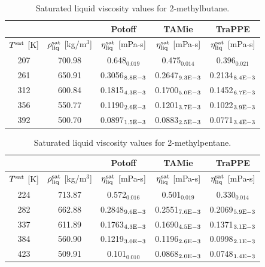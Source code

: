 \documentclass[preprint,review,11pt]{elsarticle}
\begin{document}
	\begin{table}[H]
		\caption{Saturated liquid viscosity values for 2-methylbutane.}
		\begin{center}
			\begin{tabular}{|c|c|c|c|c|}
				\hline
				&                                       & Potoff            & TAMie             & TraPPE            \\ \hline
				$T^{\rm sat}$ {[}K{]} & $\rho^{\rm sat}_{\rm liq}$ [kg/m$^3$] & $\eta_{\rm liq}^{\rm sat}$ {[}mPa-s{]} & $\eta_{\rm liq}^{\rm sat}$ {[}mPa-s{]} & $\eta_{\rm liq}^{\rm sat}$ {[}mPa-s{]} \\ \hline
				207 & 700.98 & 0.648$_{0.019}$   & 0.475$_{0.014}$   & 0.396$_{0.021}$   \\ \hline
				261 & 650.91 & 0.3056$_{8.8 \rm E-3}$ & 0.2647$_{9.3 \rm E-3}$ & 0.2134$_{8.4 \rm E-3}$ \\ \hline
				312 & 600.84 & 0.1815$_{4.3 \rm E-3}$ & 0.1700$_{5.0 \rm E-3}$ & 0.1452$_{6.7 \rm E-3}$ \\ \hline
				356 & 550.77 & 0.1190$_{2.6 \rm E-3}$ & 0.1201$_{3.7 \rm E-3}$ & 0.1022$_{3.9 \rm E-3}$ \\ \hline
				392 & 500.70 & 0.0897$_{1.5 \rm E-3}$ & 0.0883$_{2.5 \rm E-3}$ & 0.0771$_{3.4 \rm E-3}$ \\ \hline
			\end{tabular}
		\end{center}
	\end{table}
	
	\begin{table}[H]
		\caption{Saturated liquid viscosity values for 2-methylpentane.}
		\begin{center}
			\begin{tabular}{|c|c|c|c|c|}
				\hline
				&                                       & Potoff            & TAMie             & TraPPE            \\ \hline
				$T^{\rm sat}$ {[}K{]} & $\rho^{\rm sat}_{\rm liq}$ [kg/m$^3$] & $\eta_{\rm liq}^{\rm sat}$ {[}mPa-s{]} & $\eta_{\rm liq}^{\rm sat}$ {[}mPa-s{]} & $\eta_{\rm liq}^{\rm sat}$ {[}mPa-s{]} \\ \hline
				224 & 713.87 & 0.572$_{0.016}$   & 0.501$_{0.019}$   & 0.330$_{0.014}$   \\ \hline
				282 & 662.88 & 0.2848$_{9.6 \rm E-3}$ & 0.2551$_{7.6 \rm E-3}$ & 0.2069$_{5.9 \rm E-3}$ \\ \hline
				337 & 611.89 & 0.1763$_{4.3 \rm E-3}$ & 0.1690$_{4.5 \rm E-3}$ & 0.1371$_{3.1 \rm E-3}$ \\ \hline
				384 & 560.90 & 0.1219$_{3.0 \rm E-3}$ & 0.1196$_{2.6 \rm E-3}$ & 0.0998$_{2.1 \rm E-3}$ \\ \hline
				423 & 509.91 & 0.101$_{0.010}$   & 0.0868$_{2.0 \rm E-3}$ & 0.0748$_{1.4 \rm E-3}$ \\ \hline
			\end{tabular}
		\end{center}
	\end{table}
	
\end{document}
